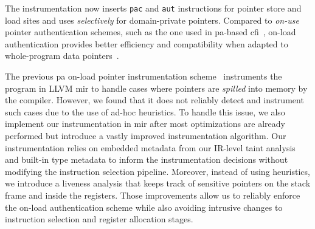 



The instrumentation now inserts \texttt{pac} and \texttt{aut} instructions for pointer store and load sites and uses  \emph{selectively} for domain-private pointers. 
Compared to \emph{on-use} pointer authentication schemes, such as the one used in \gls{pa}-based \gls{cfi}~\cite{pac-it-up,kernel-pac}, on-load authentication provides better efficiency and compatibility when adapted to whole-program data pointers~\cite{pac-it-up}.

The previous \gls{pa} on-load pointer instrumentation scheme~\cite{pac-it-up} instruments the program in LLVM \gls{mir} to handle cases where pointers are \emph{spilled} into memory by the compiler.
However, we found that it does not reliably detect and instrument such cases due to the use of ad-hoc heuristics.
To handle this issue, we also implement our instrumentation in \gls{mir} after most optimizations are already performed but introduce a vastly improved instrumentation algorithm.
Our instrumentation relies on embedded metadata from our IR-level taint analysis and built-in type metadata to inform the instrumentation decisions without modifying the instruction selection pipeline.
Moreover, instead of using heuristics, we introduce a liveness analysis that keeps track of sensitive pointers on the stack frame and inside the registers.
Those improvements allow us to reliably enforce the on-load authentication scheme while also avoiding intrusive changes to instruction selection and register allocation stages.



